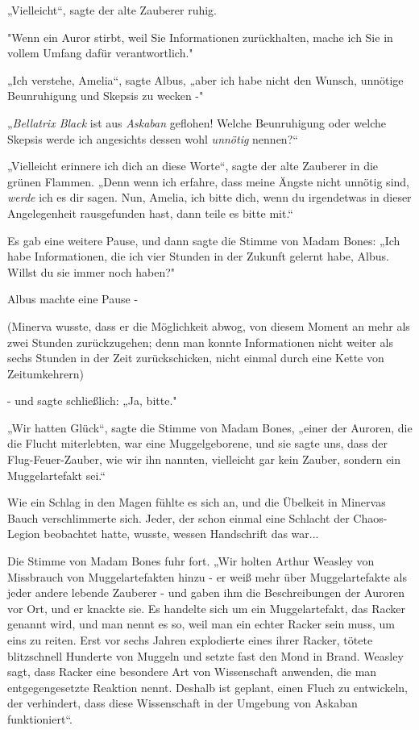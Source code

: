 {„Vielleicht“, sagte der alte Zauberer ruhig.

"Wenn ein Auror stirbt, weil Sie Informationen zurückhalten, mache ich Sie in vollem Umfang dafür verantwortlich."

„Ich verstehe, Amelia“, sagte Albus, „aber ich habe nicht den Wunsch, unnötige Beunruhigung und Skepsis zu wecken -"

„\emph{Bellatrix Black} ist aus \emph{Askaban} geflohen! Welche Beunruhigung oder welche Skepsis werde ich angesichts dessen wohl \emph{unnötig} nennen?“

„Vielleicht erinnere ich dich an diese Worte“, sagte der alte Zauberer in die grünen Flammen. „Denn wenn ich erfahre, dass meine Ängste nicht unnötig sind, \emph{werde} ich es dir sagen. Nun, Amelia, ich bitte dich, wenn du irgendetwas in dieser Angelegenheit rausgefunden hast, dann teile es bitte mit.“

Es gab eine weitere Pause, und dann sagte die Stimme von Madam Bones: „Ich habe Informationen, die ich vier Stunden in der Zukunft gelernt habe, Albus. Willst du sie immer noch haben?"

Albus machte eine Pause -

(Minerva wusste, dass er die Möglichkeit abwog, von diesem Moment an mehr als zwei Stunden zurückzugehen; denn man konnte Informationen nicht weiter als sechs Stunden in der Zeit zurückschicken, nicht einmal durch eine Kette von Zeitumkehrern)

- und sagte schließlich: „Ja, bitte."

„Wir hatten Glück“, sagte die Stimme von Madam Bones, „einer der Auroren, die die Flucht miterlebten, war eine Muggelgeborene, und sie sagte uns, dass der Flug-Feuer-Zauber, wie wir ihn nannten, vielleicht gar kein Zauber, sondern ein Muggelartefakt sei.“

Wie ein Schlag in den Magen fühlte es sich an, und die Übelkeit in Minervas Bauch verschlimmerte sich. Jeder, der schon einmal eine Schlacht der Chaos-Legion beobachtet hatte, wusste, wessen Handschrift das war...

Die Stimme von Madam Bones fuhr fort. „Wir holten Arthur Weasley von Missbrauch von Muggelartefakten hinzu - er weiß mehr über Muggelartefakte als jeder andere lebende Zauberer - und gaben ihm die Beschreibungen der Auroren vor Ort, und er knackte sie. Es handelte sich um ein Muggelartefakt, das Racker genannt wird, und man nennt es so, weil man ein echter Racker sein muss, um eins zu reiten. Erst vor sechs Jahren explodierte eines ihrer Racker, tötete blitzschnell Hunderte von Muggeln und setzte fast den Mond in Brand. Weasley sagt, dass Racker eine besondere Art von Wissenschaft anwenden, die man entgegengesetzte Reaktion nennt. Deshalb ist geplant, einen Fluch zu entwickeln, der verhindert, dass diese Wissenschaft in der Umgebung von Askaban funktioniert“.

}
